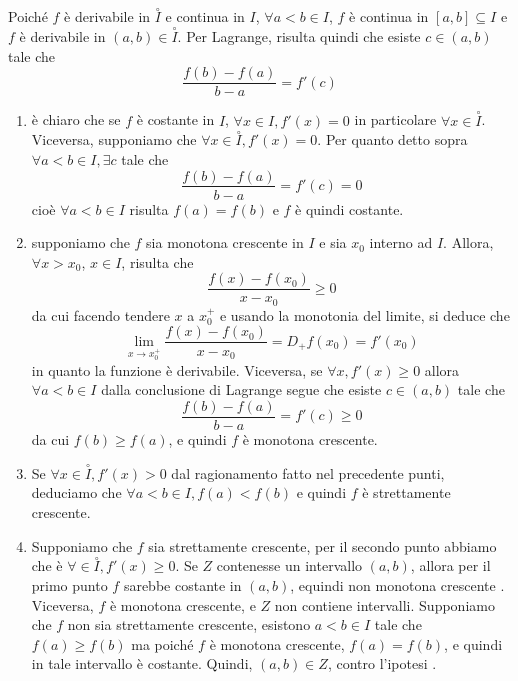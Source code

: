 \documentclass[a4paper]{article}
\begin{document}
\begin{snippetproof}{}
    Poiché \(f\) è derivabile in \(\overset{\circ}{I}\) e continua in \(I\),
    \(\forall a < b \in I\), \(f\) è continua in \([a,b] \subseteq I\)
    e \(f\) è derivabile in \((a,b) \in \overset{\circ}{I}\).
    Per Lagrange, risulta quindi che esiste \(c \in (a,b)\) tale che
    \[
        \frac{f(b) - f(a)}{b-a} = f'(c)
    \]
    \begin{enumerate}
        \item è chiaro che se \(f\) è costante in \(I\), \(\forall x \in I, f'(x) = 0\)
        in particolare \(\forall x \in \overset{\circ}{I}\).
        Viceversa, supponiamo che \(\forall x \in \overset{\circ}{I}, f'(x) = 0\).
        Per quanto detto sopra \(\forall a<b \in I, \exists c\) tale che
        \[
            \frac{f(b) - f(a)}{b-a} = f'(c) = 0
        \]
        cioè \(\forall a<b \in I\) risulta \(f(a) = f(b)\)
        e \(f\) è quindi costante.
        \item supponiamo che \(f\) sia monotona crescente in \(I\) e sia \(x_0\)
        interno ad \(I\). Allora, \(\forall x > x_0\), \(x\in I\), risulta
        che \[
            \frac{f(x) - f(x_0)}{x-x_0} \geq 0
        \]
        da cui facendo tendere \(x\) a \(x_0^+\) e usando la monotonia del limite, si deduce che
        \[
            \lim_{x\to x_0^+} \frac{f(x) - f(x_0)}{x-x_0} = D_+f(x_0) = f'(x_0)
        \]
        in quanto la funzione è derivabile. Viceversa, se \(\forall x, f'(x) \geq 0\)
        allora \(\forall a<b \in I\) dalla conclusione di Lagrange segue che esiste \(c\in (a,b)\)
        tale che \[
            \frac{f(b) - f(a)}{b-a} = f'(c) \geq 0
        \]
        da cui \(f(b) \geq f(a)\), e quindi \(f\) è monotona crescente.
        \item Se \(\forall x \in \overset{\circ}{I}, f'(x) > 0\) dal ragionamento fatto nel precedente punti,
        deduciamo che \(\forall a<b \in I, f(a) < f(b)\) e quindi \(f\) è strettamente crescente.
        \item Supponiamo che \(f\) sia strettamente crescente, per il secondo punto abbiamo
        che è \(\forall \in \overset{\circ}{I}, f'(x) \geq 0\).
        Se \(Z\) contenesse un intervallo \((a,b)\), allora per il primo punto \(f\) sarebbe costante
        in \((a,b)\), equindi non monotona crescente \lightning.
        Viceversa, \(f\) è monotona crescente, e \(Z\) non contiene intervalli.
        Supponiamo che \(f\) non sia strettamente crescente, esistono \(a<b \in I\)
        tale che \(f(a) \geq f(b)\) ma poiché \(f\) è monotona crescente, \(f(a) = f(b)\),
        e quindi in tale intervallo è costante. Quindi, \((a,b) \in Z\), contro l'ipotesi \lightning.
    \end{enumerate}
\end{snippetproof}
\end{document}
